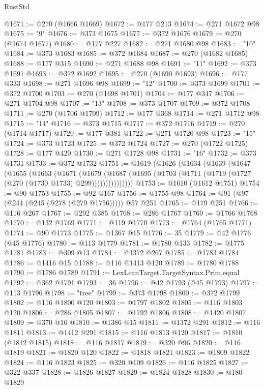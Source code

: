 \begin{lexlean}{RustStd}
\begin{coremodule}
@1671 := @270 (@1666 @1669)
@1672 := @177 @213
@1674 := @271 @1672 @98
@1675 := "9"
@1676 := @373 @1675
@1677 := @372 @1676
@1679 := @270 (@1674 @1677)
@1680 := @177 @227
@1682 := @271 @1680 @98
@1683 := "10"
@1684 := @373 @1683
@1685 := @372 @1684
@1687 := @270 (@1682 @1685)
@1688 := @177 @315
@1690 := @271 @1688 @98
@1691 := "11"
@1692 := @373 @1691
@1693 := @372 @1692
@1695 := @270 (@1690 @1693)
@1696 := @177 @333
@1698 := @271 @1696 @98
@1699 := "12"
@1700 := @373 @1699
@1701 := @372 @1700
@1703 := @270 (@1698 @1701)
@1704 := @177 @347
@1706 := @271 @1704 @98
@1707 := "13"
@1708 := @373 @1707
@1709 := @372 @1708
@1711 := @270 (@1706 @1709)
@1712 := @177 @368
@1714 := @271 @1712 @98
@1715 := "14"
@1716 := @373 @1715
@1717 := @372 @1716
@1719 := @270 (@1714 @1717)
@1720 := @177 @381
@1722 := @271 @1720 @98
@1723 := "15"
@1724 := @373 @1723
@1725 := @372 @1724
@1727 := @270 (@1722 @1725)
@1728 := @177 @420
@1730 := @271 @1728 @98
@1731 := "16"
@1732 := @373 @1731
@1733 := @372 @1732
@1751 := @1619
    (@1626
      (@1634
        (@1639
          (@1647
            (@1655
              (@1663
                (@1671
                  (@1679
                    (@1687
                      (@1695 (@1703 (@1711 (@1719 (@1727 (@270 (@1730 @1733) @299)))))))))))))))
@1753 := @1610 (@1612 @1751)
@1754 := @90 @1753
@1755 := @92 @167
@1756 := @1755 @98
@1764 := @91 (@97 (@244 (@245 (@278 (@279 @1756))))) @57 @251
@1765 := @179 @251
@1766 := @116 @267
@1767 := @292 @385
@1768 := @286 @1767
@1769 := @1766 @1768
@1770 := @132 @1769
@1771 := @119 @1770
@1773 := @1764 (@1765 @1771)
@1774 := @90 @1773
@1775 := @1367 @15
@1776 := 35
@1779 := @42 @1776 (@45 @1776)
@1780 := @113 @1779
@1781 := @1780 @133
@1782 := @1775 @1781
@1783 := @309 @13
@1784 := @1372 @267
@1785 := @1783 @1784
@1786 := @1416 @15
@1788 := @116 @1413 @120
@1789 := @1780 @1788
@1790 := @1786 @1789
@1791 := LexLeanTarget.TargetSyntax.Prim.equal
@1792 := @362 @1791
@1793 := 36
@1796 := @42 @1793 (@45 @1793)
@1797 := @113 @1796
@1798 := "tree"
@1799 := @373 @1798
@1800 := @372 @1799
@1802 := @116 @1800 @120
@1803 := @1797 @1802
@1805 := @116 @1803 @120
@1806 := @286 @1805
@1807 := @1792 @1806
@1808 := @1420 @1807
@1809 := @370 @16
@1810 := @1386 @15
@1811 := @1372 @291
@1812 := @116 @1811
@1813 := @1412 @291
@1815 := @116 @1813 @120
@1817 := @1810 (@1812 @1815)
@1818 := @116 @1817
@1819 := @320 @96
@1820 := @116 @1819
@1821 := @1820 @120
@1822 := @1818 @1821
@1823 := @1809 @1822
@1824 := @116 @1823
@1825 := @320 @109
@1826 := @116 @1825
@1827 := @322 @337
@1828 := @1826 @1827
@1829 := @1824 @1828
@1830 := @180 @1829

\end{coremodule}
\end{lexlean}
